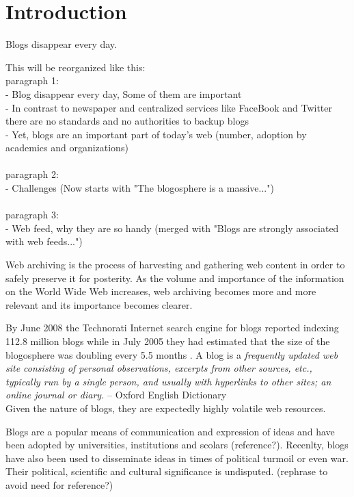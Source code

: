 \section{Introduction}

Blogs disappear every day.

This will be reorganized like this:\\
paragraph 1:\\
- Blog disappear every day, Some of them are important\\
- In contrast to newspaper and centralized services like FaceBook and Twitter there are no standards and no authorities to backup blogs\\
- Yet, blogs are an important part of today's web (number, adoption by academics and organizations)\\
\\
paragraph 2:\\
- Challenges (Now starts with "The blogosphere is a massive...")\\
\\
paragraph 3:\\
- Web feed, why they are so handy (merged with "Blogs are strongly associated with web feeds...")

Web archiving is the process of harvesting and gathering web content in order to safely preserve it for posterity. As the volume and importance of the information on the World Wide Web increases, web archiving becomes more and more relevant and its importance becomes clearer. 

By June 2008 the Technorati Internet search engine for blogs reported indexing 112.8 million blogs \cite{technoratidata2008} while in July 2005 they had estimated that the size of the blogosphere was doubling every 5.5 months \cite{bloggrowth2005}. A blog is a \emph{frequently updated web site consisting of personal observations, excerpts from other sources, etc., typically run by a single person, and usually with hyperlinks to other sites; an online journal or diary.} -- Oxford English Dictionary\\ Given the nature of blogs, they are expectedly highly volatile web resources.

Blogs are a popular means of communication and expression of ideas and have been adopted by universities, institutions and scolars (reference?). Recenlty, blogs have also been used to disseminate ideas in times of political turmoil or even war\cite{nahedeltantawy2012}. Their political, scientific and cultural significance is undisputed. (rephrase to avoid need for reference?)

